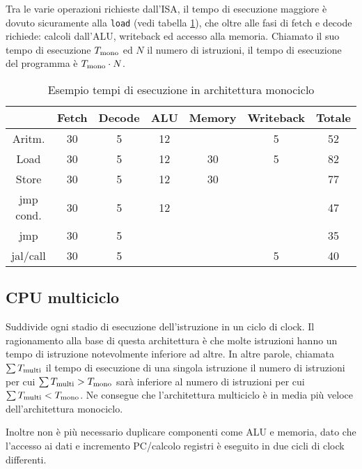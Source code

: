 \documentclass[../ace.tex]{subfiles}
\begin{document}
Tra le varie operazioni richieste dall'ISA, il tempo di esecuzione maggiore è dovuto sicuramente alla \lstinline{load} (vedi
tabella \ref{tab:tempi_esecuzione_monociclo}),
che oltre alle fasi di fetch e decode richiede: calcoli dall'ALU, writeback ed accesso alla memoria.
Chiamato il suo tempo di esecuzione $T_\text{mono}$ ed $N$ il numero di istruzioni, il tempo di esecuzione del programma è $T_\text{mono} \cdot N$.

\begin{table}[t]
    \centering
    \begin{tabular}{|c|c|c|c|c|c|c|}
        \hline
    & Fetch  & Decode & ALU & Memory & Writeback & Totale \\
    \hline
        Aritm.   & 30 & 5 &  12 &        &         5 &      52\\
        Load     & 30 & 5 &  12 &     30 &         5 &      82\\
        Store    & 30 & 5 &  12 &     30 &           &      77\\
        jmp cond.& 30 & 5 &  12 &        &           &      47\\
        jmp      & 30 & 5 &     &        &           &      35\\
        jal/call & 30 & 5 &     &        &         5 &      40\\
        \hline
    \end{tabular}
    \caption{Esempio tempi di esecuzione in architettura monociclo}
    \label{tab:tempi_esecuzione_monociclo}
\end{table}

\subsection{CPU multiciclo}
Suddivide ogni stadio di esecuzione dell'istruzione in un ciclo di clock.
Il ragionamento alla base di questa architettura è che molte istruzioni hanno un tempo di istruzione notevolmente inferiore ad altre.
In altre parole, chiamata $\sum T_\text{multi}$ il tempo di esecuzione di una singola istruzione il numero di istruzioni per cui
$\sum T_\text{multi} > T_\text{mono}$ sarà inferiore al numero di istruzioni per cui $\sum T_\text{multi} < T_\text{mono}$.
Ne consegue che l'architettura multiciclo è in media più veloce dell'architettura monociclo.

Inoltre non è più necessario duplicare componenti come ALU e memoria, dato che l'accesso ai dati e incremento PC/calcolo registri è
eseguito in due cicli di clock differenti.
\end{document}
